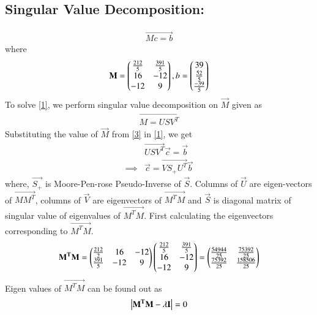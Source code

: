 \documentclass[journal,12pt,twocolumn]{IEEEtran}
\begin{document}
\subsection{Singular Value Decomposition:}
\begin{align}
\vec{Mc=b} \label{1}
\end{align}
where
\begin{align}
\mathbf{M} = \begin{pmatrix}\frac{212}{5} & \frac{391}{5} \\ 16 & -12 \\ -12 & 9\end{pmatrix},b = \begin{pmatrix}39 \\\frac{52}{5}\\\frac{-39}{5}\end{pmatrix}\label{2}	
\end{align}
To solve \eqref{1}, we perform singular value decomposition on $\vec{M}$ given as 
\begin{align}
	\vec{M = USV^T }\label{3}
\end{align}
Substituting the value of $\vec{M}$ from \eqref{3} in \eqref{1}, we get
\begin{align}
	&\vec{USV^T}\vec{c} = \vec{b} \\
\implies& \vec{c} = \vec{VS_+U^T}\vec{b}\label{4}
\end{align}
where, $\vec{S_+}$ is Moore-Pen-rose Pseudo-Inverse of $\vec{S}$. Columns of $\vec{U}$ are eigen-vectors of $\vec{MM^T}$, columns of $\vec{V}$ are eigenvectors of $\vec{M^TM}$ and $\vec{S}$ is diagonal matrix of singular value of eigenvalues of $\vec{M^TM}$. First calculating the eigenvectors corresponding to $\vec{M^TM}$.
\begin{align}
    \mathbf{M^TM} = \begin{pmatrix}\frac{212}{2} & 16 & -12 \\ \frac{391}{5} & -12 & 9 \end{pmatrix} \begin{pmatrix}\frac{212}{5} & \frac{391}{5} \\ 16 & -12 \\ -12 & 9\end{pmatrix} = \begin{pmatrix}\frac{54944}{25} & \frac{75392}{25} \\ \frac{75392}{25} & \frac{158506}{25}\end{pmatrix}
\end{align}
Eigen values of $\vec{M^TM}$ can be found out as
\begin{align}
	 \left\vert\mathbf{M^TM-\lambda I}\right\vert = 0
\end{align}
\end{document}
